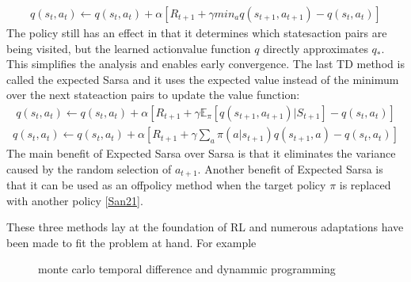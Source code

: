 \documentclass[letterpaper,10pt,english]{jupyterBook}
\let\sphinxpxdimen\pdfpxdimen\else\newdimen\sphinxpxdimen
\begin{document}
\begin{equation}\label{equation:Reinforcement_learning:Q-learning}
\begin{split}q(s_t, a_t) \leftarrow q(s_t, a_t) + \alpha[R_{t+1} + \gamma min_a q(s_{t+1}, a_{t+1}) - q(s_t, a_t)] \end{split}
\end{equation}
\sphinxAtStartPar
The policy still has an effect in that it determines which states\sphinxhyphen{}action pairs are being visited, but the learned action\sphinxhyphen{}value function \(q\) directly approximates \(q_*\). This simplifies the analysis and enables early convergence. The last TD method is called the expected Sarsa and it uses the expected value instead of the minimum over the next state\sphinxhyphen{}action pairs to update the value function:
\begin{equation*}
\begin{split}  q(s_t, a_t) \leftarrow q(s_t, a_t) + \alpha[R_{t+1} + \gamma \mathbb{E}_{\pi}[q(s_{t+1}, a_{t+1})|S_{t+1}] - q(s_t, a_t)] \end{split}
\end{equation*}\begin{equation*}
\begin{split} q(s_t, a_t) \leftarrow q(s_t, a_t) + \alpha[R_{t+1} + \gamma \sum_a \pi(a|s_{t+1}) q(s_{t+1}, a) - q(s_t, a_t)] \end{split}
\end{equation*}
\sphinxAtStartPar
The main benefit of Expected Sarsa over Sarsa is that it eliminates the variance caused by the random selection of \(a_{t+1}\). Another benefit of Expected Sarsa is that it can be used as an off\sphinxhyphen{}policy method when the target policy \(\pi\) is replaced with another policy {[}\hyperlink{cite.Discussion:id50}{San21}{]}.

\sphinxAtStartPar
These three methods lay at the foundation of RL and numerous adaptations have been made to fit the problem at hand. For example

\begin{figure}[htbp]
\centering
\capstart

\noindent\sphinxincludegraphics[width=500\sphinxpxdimen,height=350\sphinxpxdimen]{{different_methods}.png}
\caption{monte carlo temporal difference and dynammic programming}\label{\detokenize{Reinforcement_learning:diff-meth-fig}}\end{figure}
\end{document}
